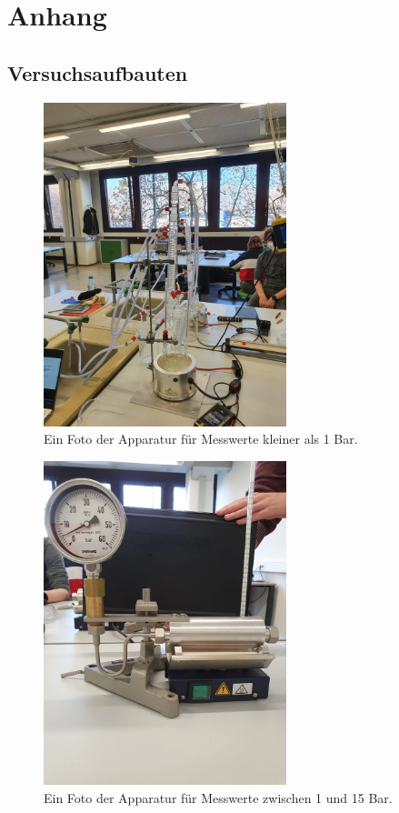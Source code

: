 \section{Anhang}

\subsection{Versuchsaufbauten}
\begin{figure}[H]
    \centering
    \includegraphics[width=0.63\textwidth]{images/Versuch_kleiner_1_bar.jpg}
    \caption{Ein Foto der Apparatur für Messwerte kleiner als 1 Bar.}
    \label{img:real1}
\end{figure}

\begin{figure}[H]
    \centering
    \includegraphics[width=0.63\textwidth]{images/Versuch_1-15bar_front.jpg}
    \caption{Ein Foto der Apparatur für Messwerte zwischen 1 und 15 Bar.}
    \label{img:real2}
\end{figure}



